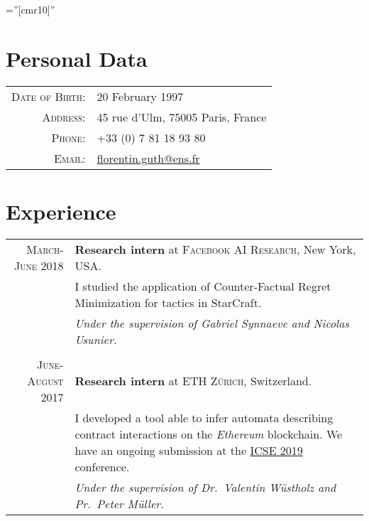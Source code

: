 \documentclass[a4paper,10pt]{article} %
\begin{document}
\pagestyle{empty} %

\font\fb=''[cmr10]'' %

\par{\bigskip\par} %



\section{Personal Data}

\begin{tabular}{rl}
\textsc{Date of Birth:} & 20 February 1997 \\
\textsc{Address:} & 45 rue d'Ulm, 75005 Paris, France \\
\textsc{Phone:} & +33 (0) 7 81 18 93 80\\
\textsc{Email:} & \href{mailto:florentin.guth@ens.fr}{florentin.guth@ens.fr}
\end{tabular}


\section{Experience}

\begin{tabular}{r|p{10.5cm}}

\textsc{March-June 2018} & \textbf{Research intern} at \textsc{Facebook AI Research}, New York, USA. \\ 
                         & {I studied the application of Counter-Factual Regret Minimization for tactics in StarCraft.} \\ & \emph{Under the supervision of Gabriel Synnaeve and Nicolas Usunier.}\\
\multicolumn{2}{c}{} \\

\textsc{June-August 2017} & \textbf{Research intern} at \textsc{ETH Zürich}, Switzerland. \\ 
                         & {I developed a tool able to infer automata describing contract interactions on the \emph{Ethereum} blockchain. We have an ongoing submission at the \href{https://conf.researchr.org/home/icse-2019}{ICSE 2019} conference.} \\ & \emph{Under the supervision of Dr.\ Valentin Wüstholz and Pr.\ Peter Müller.}\\

\end{tabular}
\end{document}
